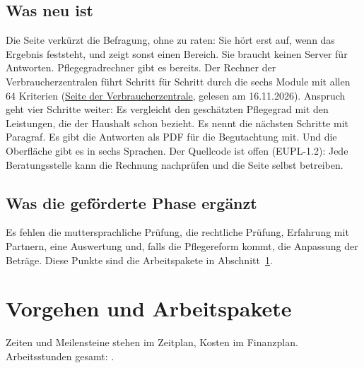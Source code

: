 \documentclass[11pt,a4paper,parskip=half-]{scrartcl}
\begin{document}
\subsection{Was neu ist}
%
Die Seite verkürzt die Befragung, ohne zu raten: Sie hört erst auf, wenn das Ergebnis feststeht,
und zeigt sonst einen Bereich. Sie braucht keinen Server für Antworten.
Pflegegradrechner gibt es bereits. Der Rechner der Verbraucherzentralen führt Schritt für Schritt
durch die sechs Module mit allen 64 Kriterien
(\href{https://www.verbraucherzentrale.de/gesundheit-pflege/pflegegradrechner-berechnen-sie-kostenlos-ihren-pflegegrad-93979}{Seite der Verbraucherzentrale}, gelesen am 16.11.2026).%
Anspruch geht vier Schritte weiter: Es vergleicht den geschätzten Pflegegrad mit den Leistungen,
die der Haushalt schon bezieht. Es nennt die nächsten Schritte mit Paragraf. Es gibt die Antworten
als PDF für die Begutachtung mit. Und die Oberfläche gibt es in sechs Sprachen.
Der Quellcode ist offen (EUPL-1.2): Jede Beratungsstelle kann die Rechnung nachprüfen und die Seite
selbst betreiben.

\subsection{Was die geförderte Phase ergänzt}
Es fehlen die muttersprachliche Prüfung, die rechtliche Prüfung, Erfahrung mit Partnern, eine Auswertung
und, falls die Pflegereform kommt, die Anpassung der Beträge. Diese Punkte sind die Arbeitspakete in
Abschnitt~\ref{sec:ap}.

\section{Vorgehen und Arbeitspakete}\label{sec:ap}
%
Zeiten und Meilensteine stehen im Zeitplan, Kosten im Finanzplan.
Arbeitsstunden gesamt: .
\end{document}
